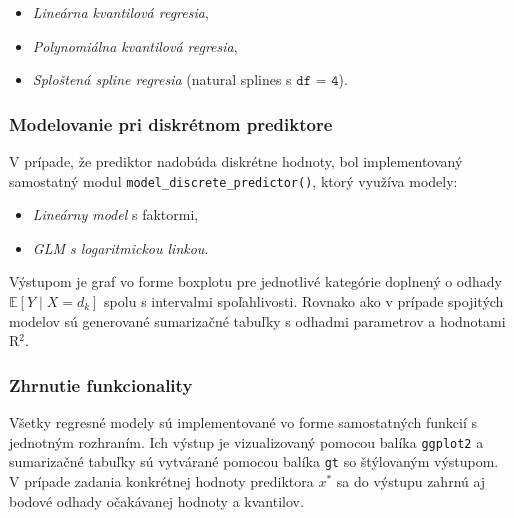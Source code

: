 \begin{itemize}
  \item \textit{Lineárna kvantilová regresia},
  \item \textit{Polynomiálna kvantilová regresia},
  \item \textit{Sploštená spline regresia} (natural splines s $\texttt{df = 4}$).
\end{itemize}

\subsubsection{Modelovanie pri diskrétnom prediktore}

V prípade, že prediktor nadobúda diskrétne hodnoty, bol implementovaný samostatný modul \texttt{model\_discrete\_predictor()}, ktorý využíva modely:
\begin{itemize}
  \item \textit{Lineárny model} s faktormi,
  \item \textit{GLM s logaritmickou linkou}.
\end{itemize}

Výstupom je graf vo forme boxplotu pre jednotlivé kategórie doplnený o odhady $\mathbb{E}[Y \mid X = d_k]$ spolu s intervalmi spoľahlivosti. Rovnako ako v prípade spojitých modelov sú generované sumarizačné tabuľky s odhadmi parametrov a hodnotami R$^2$.

\subsubsection{Zhrnutie funkcionality}

Všetky regresné modely sú implementované vo forme samostatných funkcií s jednotným rozhraním. Ich výstup je vizualizovaný pomocou balíka \texttt{ggplot2} a sumarizačné tabuľky sú vytvárané pomocou balíka \texttt{gt} so štýlovaným výstupom. V prípade zadania konkrétnej hodnoty prediktora $x^*$ sa do výstupu zahrnú aj bodové odhady očakávanej hodnoty a kvantilov.
